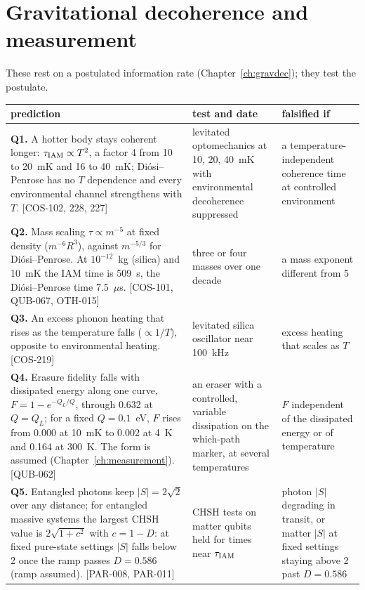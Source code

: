 \section{Gravitational decoherence and measurement}

These rest on a postulated information rate (Chapter~\ref{ch:gravdec}); they test the postulate.

{\small\begin{longtable}{@{}>{\raggedright\arraybackslash}p{}>{\raggedright\arraybackslash}p{}>{\raggedright\arraybackslash}p{}@{}}
\toprule
prediction & test and date & falsified if \\\midrule\endhead
\textbf{Q1.} \Spending{} A hotter body stays coherent longer: $\tau_{\rm IAM}\propto T^2$, a factor 4 from 10 to 20~mK and 16 to 40~mK; Di\'osi--Penrose has no
 $T$ dependence and every environmental channel strengthens with $T$. [COS-102, 228, 227]
 & levitated optomechanics at 10, 20, 40~mK with environmental decoherence suppressed
 & a temperature-independent coherence time at controlled environment \\
\textbf{Q2.} \Spending{} Mass scaling $\tau\propto m^{-5}$ at fixed density ($m^{-6}R^3$), against $m^{-5/3}$ for Di\'osi--Penrose. At $10^{-12}$~kg (silica) and
 10~mK the IAM time is 509~s, the Di\'osi--Penrose time 7.5~$\mu$s. [COS-101, QUB-067, OTH-015]
 & three or four masses over one decade
 & a mass exponent different from 5 \\
\textbf{Q3.} \Spending{} An excess phonon heating that rises as the temperature falls ($\propto1/T$), opposite to environmental heating. [COS-219]
 & levitated silica oscillator near 100~kHz
 & excess heating that scales as $T$ \\
\textbf{Q4.} \Spending{} Erasure fidelity falls with dissipated energy along one curve, $F=1-e^{-Q_L/Q}$, through 0.632 at $Q=Q_L$; for a fixed $Q=0.1$~eV,
 $F$ rises from 0.000 at 10~mK to 0.002 at 4~K and 0.164 at 300~K. The form is assumed (Chapter~\ref{ch:measurement}). [QUB-062]
 & an eraser with a controlled, variable dissipation on the which-path marker, at several temperatures
 & $F$ independent of the dissipated energy or of temperature \\
\textbf{Q5.} \Spending{} Entangled photons keep $|S|=2\sqrt2$ over any distance; for entangled massive systems the largest CHSH value is
 $2\sqrt{1+c^2}$ with $c=1-D$: at fixed pure-state settings $|S|$ falls below 2 once the ramp passes $D=0.586$ (ramp assumed). [PAR-008, PAR-011]
 & CHSH tests on matter qubits held for times near $\tau_{\rm IAM}$
 & photon $|S|$ degrading in transit, or matter $|S|$ at fixed settings staying above 2 past $D=0.586$ \\
\bottomrule
\end{longtable}}


